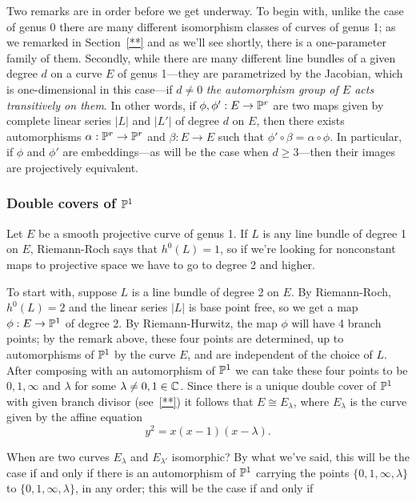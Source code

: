 Two remarks are in order before we get underway. To begin with, unlike the case of genus 0 there are many different isomorphism classes of curves of genus 1; as we remarked in Section~\ref{**} and as we'll see shortly, there is a one-parameter family of them. Secondly, while there are many different line bundles of a given degree $d$ on a curve $E$ of genus 1---they are parametrized by the Jacobian, which is one-dimensional in this case---if $d \neq 0$ \emph{the automorphism group of $E$ acts transitively on them}. In other words, if $\phi, \phi' : E \to \PP^r$ are two maps given by complete linear series $|L|$ and $|L'|$ of degree $d$ on $E$, then there exists  automorphisms $\alpha : \PP^r \to \PP^r$ and $\beta : E \to E$ such that $\phi' \circ \beta= \alpha \circ \phi$. In particular, if $\phi$ and $\phi'$ are embeddings---as will be the case when $d \geq 3$---then their images are projectively equivalent.

\subsubsection{Double covers of $\PP^1$}

Let $E$ be a smooth projective curve of genus 1. If $L$ is any line bundle of degree 1 on $E$, Riemann-Roch says that $h^0(L) = 1$, so if we're looking for nonconstant maps to projective space we have to go to degree 2 and higher.

To start with, suppose $L$ is a line bundle of degree 2 on $E$. By Riemann-Roch, $h^0(L) = 2$ and the linear series $|L|$ is base point free, so we get a map $\phi : E \to \PP^1$ of degree 2. By Riemann-Hurwitz, the map $\phi$ will have 4 branch points; by the remark above, these four points are determined, up to automorphisms of $\PP^1$ by the curve $E$, and are independent of the choice of $L$.
After composing with an automorphism of $\PP^1$ we can take these four points to be $0, 1, \infty$ and $\lambda$ for some $\lambda \neq 0, 1 \in \CC$. Since there is a unique double cover of $\PP^1$ with given branch divisor (see~\ref{**}) it follows that $E \cong E_\lambda$, where $E_\lambda$ is the curve given by the affine equation
$$
y^2 = x(x-1)(x-\lambda).
$$

When are two curves $E_\lambda$ and $E_{\lambda'}$ isomorphic? By what we've said, this will be the case if and only if there is an automorphism of $\PP^1$ carrying the points $\{0,1,\infty,\lambda\}$ to $\{0,1,\infty,\lambda\}$, in any order; this will be the case if and only if

